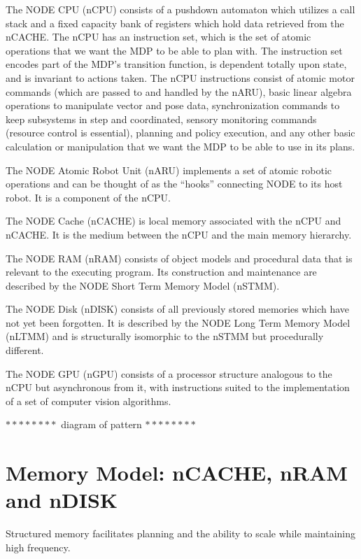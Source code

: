 \documentclass[conference]{IEEEtran}
\begin{document}
The NODE CPU (nCPU) consists of a pushdown automaton which utilizes a call stack and a fixed capacity
bank of registers which hold data retrieved from the nCACHE.
The nCPU has an instruction set, which is the set of atomic operations that we want the MDP to be able
to plan with. The instruction set encodes part of the MDP's transition function, is dependent 
totally upon state, and is invariant to actions taken.
The nCPU instructions consist of atomic motor commands (which are passed to and handled by the nARU),
basic linear algebra operations to manipulate vector and pose data, synchronization commands to keep
subsystems in step and coordinated, sensory monitoring commands (resource control is essential), 
planning and policy execution, and any other basic calculation or manipulation that we want the 
MDP to be able to use in its plans.

The NODE Atomic Robot Unit (nARU) implements a set of atomic robotic operations and can be 
thought of as the “hooks” connecting NODE to its host robot. It is a component of the nCPU.

The NODE Cache (nCACHE) is local memory associated with the nCPU and nCACHE. It is the medium
between the nCPU and the main memory hierarchy.

The NODE RAM (nRAM) consists of object models and procedural data that is relevant to the 
executing program. Its construction and maintenance are described by the NODE Short Term Memory 
Model (nSTMM).

The NODE Disk (nDISK) consists of all previously stored memories which have not yet been 
forgotten. It is described by the NODE Long Term Memory Model (nLTMM) and is structurally 
isomorphic to the nSTMM but procedurally different.

The NODE GPU (nGPU) consists of a processor structure analogous to the nCPU but asynchronous from
it, with instructions suited to the implementation of a set of computer vision algorithms.





$********$ diagram of pattern $********$


\section{Memory Model: nCACHE, nRAM and nDISK}
Structured memory facilitates planning and the ability to scale while maintaining
high frequency.
\end{document}
